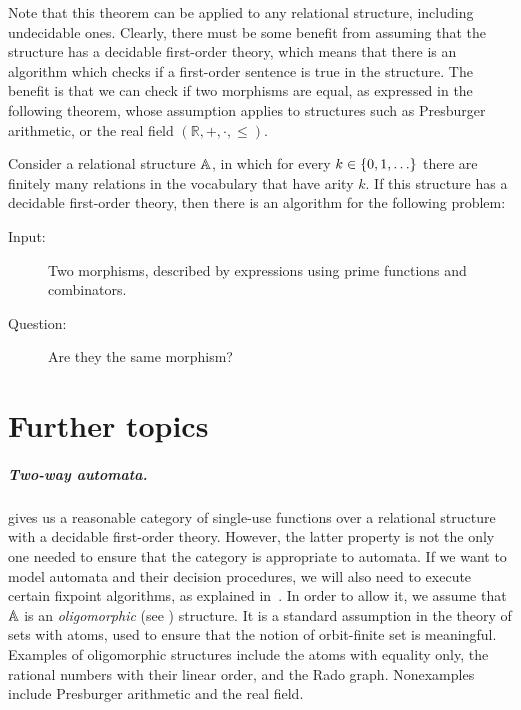 \documentclass[a4paper,UKenglish,cleveref, autoref, numberwithinsect, thm-restate]{lipics-v2021}
\begin{document}
Note that this  theorem can be applied to any relational structure, including undecidable ones. Clearly, there must be some benefit from assuming that the structure has a decidable first-order theory, which means that there is an algorithm which checks if a first-order sentence is true in the structure. 
The benefit is that we can check if two morphisms are equal, as expressed in the following theorem, whose assumption applies to structures such as Presburger arithmetic, or the real field $(\mathbb R, +, \cdot, \leq)$.

\begin{theorem}\label{thm:first-order-decidable}
    Consider a relational structure $\mathbb A$, in which for every $k \in \{0,1,\ldots\}$ there are finitely many relations in the vocabulary that have arity $k$. If this structure has a decidable first-order theory, then there is an algorithm for the following problem:
    \begin{description}
        \item[Input:] Two morphisms, described by expressions using prime functions and combinators.
        \item[Question:] Are they the same morphism?
    \end{description}
\end{theorem}



\section{Further topics}
\label{sec:further-topics}

\subparagraph{Two-way automata.}

 gives us a reasonable category of single-use functions over a relational structure with a decidable first-order theory. 
However, the latter property is not the only one needed to ensure that the category is appropriate to automata. If we want to model automata and their decision procedures, we will also need to execute certain fixpoint algorithms, as explained in~\cite{bojanczyk_slightly2018}.
In order to allow it, we assume that $\mathbb A$ is an \emph{oligomorphic} (see \cite[Definition~3.9]{bojanczyk_slightly2018}) structure.
It is a standard assumption in the theory of sets with atoms, used to ensure that the notion of orbit-finite set is meaningful.
Examples of oligomorphic structures include the atoms with equality only, the rational numbers with their linear order, and the Rado graph. Nonexamples include Presburger arithmetic and the real field. 
\end{document}
